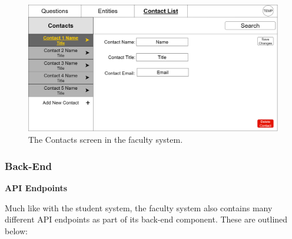 \documentclass[titlepage, 12pt]{article}
\begin{document}
\begin{figure}[h]
    \centering\includegraphics[width=1\linewidth]{images/system-design/faculty-contacts.png}
    \caption{The Contacts screen in the faculty system.}
\end{figure}





\subsubsection{Back-End}

\textbf{API Endpoints}

Much like with the student system, the faculty system also contains many different API endpoints as part of its back-end component. These are outlined below:
\end{document}
